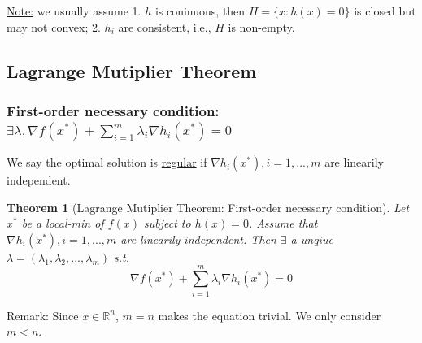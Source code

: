 \documentclass[11pt,a4paper]{article}
\newtheorem{theorem}{Theorem}
\begin{document}
\underline{Note:} we usually assume 1. $h$ is coninuous, then $H=\{x:h(x)=0\}$ is closed but may not convex; 2. $h_i$ are consistent, i.e., $H$ is non-empty.

\subsection{Lagrange Mutiplier Theorem}
\subsubsection{First-order necessary condition: $\exists\lambda, \nabla f(x^*)+\sum_{i=1}^m\lambda_i \nabla h_i(x^*)=0$}
We say the optimal solution is \underline{regular} if $\nabla h_i(x^*),i=1,...,m$ are linearily independent.
\begin{theorem}[Lagrange Mutiplier Theorem: First-order necessary condition]
    Let $x^*$ be a local-min of $f(x)$ subject to $h(x)=0$. Assume that $\nabla h_i(x^*),i=1,...,m$ are linearily independent. Then $\exists$ a unqiue $\lambda=(\lambda_1,\lambda_2,...,\lambda_m)$ s.t.
    \begin{equation}
        \nabla f(x^*)+\sum_{i=1}^m\lambda_i \nabla h_i(x^*)=0
    \end{equation}
\end{theorem}
Remark: Since $x\in \mathbb{R}^n$, $m=n$ makes the equation trivial. We only consider $m<n$.
\end{document}
